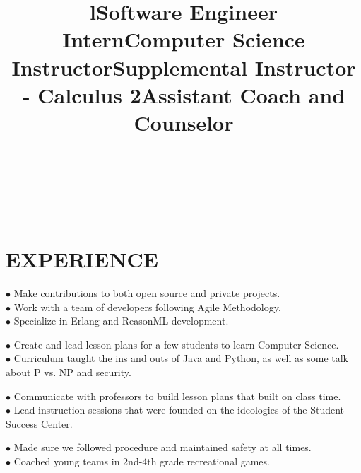\documentclass[margin]{res}
\begin{document}
\begin{resume}
\begin{format}
\title{l}\\
\\
\body\\
\end{format}

\section{EXPERIENCE}

\title{\textbf{Software Engineer Intern}}
\begin{position}
$\bullet$ Make contributions to both open source and private projects.\\
$\bullet$ Work with a team of developers following Agile Methodology.\\
$\bullet$ Specialize in Erlang and ReasonML development.
\end{position}


\title{\textbf{Computer Science Instructor}}
\begin{position}
$\bullet$ Create and lead lesson plans for a few students to learn Computer Science.\\
$\bullet$ Curriculum taught the ins and outs of Java and Python, as well as some talk about P vs. NP and security.
\end{position}

\title{\textbf{Supplemental Instructor - Calculus 2}}
\begin{position}
$\bullet$ Communicate with professors to build lesson plans that built on class time.\\
$\bullet$ Lead instruction sessions that were founded on the ideologies of the Student Success Center.
\end{position}

\title{\textbf{Assistant Coach and Counselor}}
\begin{position}
$\bullet$ Made sure we followed procedure and maintained safety at all times.\\
$\bullet$ Coached young teams in 2nd-4th grade recreational games.
\end{position}


\end{resume}
\end{document}
